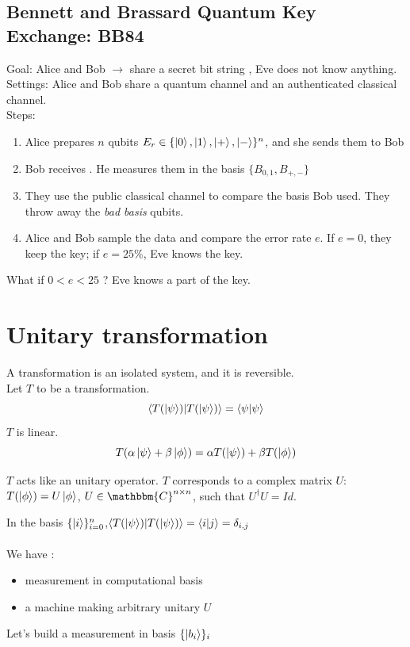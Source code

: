 \documentclass{article}
\begin{document}
\subsection{Bennett and Brassard Quantum Key Exchange: BB84}
Goal: Alice and Bob $\rightarrow$ share a secret bit string , Eve does not know anything.
\\
Settings: Alice and Bob share a quantum channel and an authenticated classical channel.
\\\noindent
Steps:
\begin{enumerate}
    \item Alice prepares $n$ qubits $E_r \in \{\ket{0}, \ket{1}, \ket{+}, \ket{-}\}^n$,
    and she sends them to Bob
    \item Bob receives . He measures them in the basis $\{B_{0,1}, B_{+,-}\}$
    \item They use the public classical channel to compare the basis Bob used. They throw away the \textit{bad basis} qubits.
    \item Alice and Bob sample the data and compare the error rate $e$. If $e=0$, they keep the key;
        if $e = 25\%$, Eve knows the key.
\end{enumerate}
What if $0 < e < 25$ ? Eve knows a part of the key.
\section{Unitary transformation}
A transformation is an isolated system, and it is reversible. \\
Let $T$ to be a transformation.
\begin{equation}
    \braket{T(\ket{\psi})|T(\ket{\psi})}=\braket{\psi|\psi}
\end{equation}
$T$ is linear.
\begin{equation}
    T(\alpha\ket{\psi} + \beta\ket{\phi}) = \alpha T(\ket{\psi}) + \beta T(\ket{\phi})
\end{equation}

$T$ acts like an unitary operator.
$T$ corresponds to a complex matrix $U$: $T(\ket{\phi}) = U\ket{\phi}$, $U \in \mathbbm{C}^{n
\times n}$,
such that $U^\dagger U= Id$.

In the basis $\{\ket{i}\}_{i=0}^n$,$\braket{T(\ket{\psi})|T(\ket{\psi})} = \braket{i|j} = \delta_{i,j}$
\\
\\
We have :
\begin{itemize}[label=-]
    \item measurement in computational basis
    \item a machine making arbitrary unitary $U$
\end{itemize}
Let's build a measurement in basis $\{\ket{b_i}\}_i$
\end{document}
